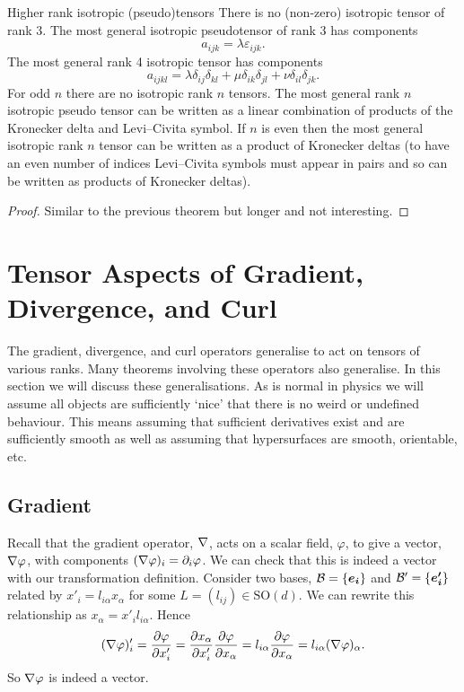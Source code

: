 \documentclass[a4paper]{article}
\newcommand{\specialOrthogonalGroup}{\mathrm{SO}}
\newcommand{\basis}{\mathcal{B}}
\newcommand{\veprime}[1]{\vv{e'_{#1}}}
\begin{document}
    \begin{theorem}{Higher rank isotropic (pseudo)tensors}{}
        There is no (non-zero) isotropic tensor of rank 3.
        The most general isotropic pseudotensor of rank 3 has components
        \[a_{ijk} = \lambda \varepsilon_{ijk}.\]
        The most general rank 4 isotropic tensor has components
        \[a_{ijkl} = \lambda\delta_{ij}\delta_{kl} + \mu\delta_{ik}\delta_{jl} + \nu\delta_{il}\delta_{jk}.\]
        For odd \(n\) there are no isotropic rank \(n\) tensors.
        The most general rank \(n\) isotropic pseudo tensor can be written as a linear combination of products of the Kronecker delta and Levi--Civita symbol.
        If \(n\) is even then the most general isotropic rank \(n\) tensor can be written as a product of Kronecker deltas (to have an even number of indices Levi--Civita symbols must appear in pairs and so can be written as products of Kronecker deltas).
    \end{theorem} 
    \begin{proof}
        Similar to the previous theorem but longer and not interesting.
        \phantom{\qedhere}  %
    \end{proof}
    
    \section{Tensor Aspects of Gradient, Divergence, and Curl}
    The gradient, divergence, and curl operators generalise to act on tensors of various ranks.
    Many theorems involving these operators also generalise.
    In this section we will discuss these generalisations.
    As is normal in physics we will assume all objects are sufficiently `nice' that there is no weird or undefined behaviour.
    This means assuming that sufficient derivatives exist and are sufficiently smooth as well as assuming that hypersurfaces are smooth, orientable, etc.
    
    \subsection{Gradient}
    Recall that the gradient operator, \(\nabla\), acts on a scalar field, \(\varphi\), to give a vector, \(\nabla\varphi\), with components \((\nabla\varphi)_i = \partial_i\varphi\).
    We can check that this is indeed a vector with our transformation definition.
    Consider two bases, \(\basis = \{\ve{i}\}\) and \(\basis' = \{\veprime{i}\}\) related by \(x'_i = l_{i\alpha}x_\alpha\) for some \(L = (l_{ij})\in\specialOrthogonalGroup(d)\).
    We can rewrite this relationship as \(x_{\alpha} = x'_il_{i\alpha}\).
    Hence
    \[(\nabla\varphi)'_i = \pdv{\varphi}{x'_i} = \pdv{x_{\alpha}}{x'_i} \pdv{\varphi}{x_\alpha} = l_{i\alpha}\pdv{\varphi}{x_{\alpha}} = l_{i\alpha}(\nabla\varphi)_\alpha.\]
    So \(\nabla\varphi\) is indeed a vector.
    
\end{document}
